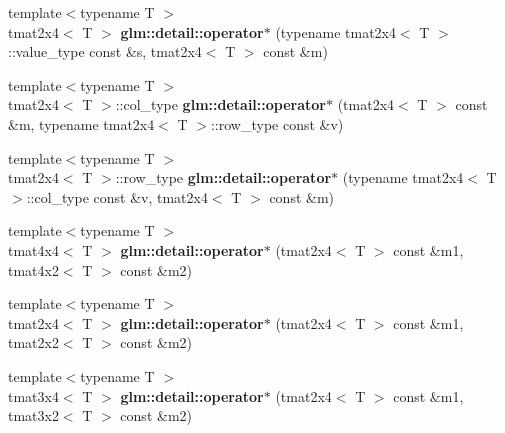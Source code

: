 \begin{DoxyCompactItemize}
\item 
\hypertarget{namespaceglm_1_1detail_a6a8f884957de815fefe3eecf14b9ad35}{{\footnotesize template$<$typename T $>$ }\\tmat2x4$<$ \-T $>$ {\bfseries glm\-::detail\-::operator$\ast$} (typename tmat2x4$<$ \-T $>$\-::value\-\_\-type const \&s, tmat2x4$<$ \-T $>$ const \&m)}\label{namespaceglm_1_1detail_a6a8f884957de815fefe3eecf14b9ad35}

\item 
\hypertarget{namespaceglm_1_1detail_a0710bfafd97af9b8c98a92748fff6468}{{\footnotesize template$<$typename T $>$ }\\tmat2x4$<$ \-T $>$\-::col\-\_\-type {\bfseries glm\-::detail\-::operator$\ast$} (tmat2x4$<$ \-T $>$ const \&m, typename tmat2x4$<$ \-T $>$\-::row\-\_\-type const \&v)}\label{namespaceglm_1_1detail_a0710bfafd97af9b8c98a92748fff6468}

\item 
\hypertarget{namespaceglm_1_1detail_acdec154bb458b5d0654955007cfa9035}{{\footnotesize template$<$typename T $>$ }\\tmat2x4$<$ \-T $>$\-::row\-\_\-type {\bfseries glm\-::detail\-::operator$\ast$} (typename tmat2x4$<$ \-T $>$\-::col\-\_\-type const \&v, tmat2x4$<$ \-T $>$ const \&m)}\label{namespaceglm_1_1detail_acdec154bb458b5d0654955007cfa9035}

\item 
\hypertarget{namespaceglm_1_1detail_aedd97c0dd2e03c63d4188983d811a436}{{\footnotesize template$<$typename T $>$ }\\tmat4x4$<$ \-T $>$ {\bfseries glm\-::detail\-::operator$\ast$} (tmat2x4$<$ \-T $>$ const \&m1, tmat4x2$<$ \-T $>$ const \&m2)}\label{namespaceglm_1_1detail_aedd97c0dd2e03c63d4188983d811a436}

\item 
\hypertarget{namespaceglm_1_1detail_ace5743bbfdfa432d7b8393eac876e614}{{\footnotesize template$<$typename T $>$ }\\tmat2x4$<$ \-T $>$ {\bfseries glm\-::detail\-::operator$\ast$} (tmat2x4$<$ \-T $>$ const \&m1, tmat2x2$<$ \-T $>$ const \&m2)}\label{namespaceglm_1_1detail_ace5743bbfdfa432d7b8393eac876e614}

\item 
\hypertarget{namespaceglm_1_1detail_a24dd8f2447519b24ae1316e2b156c278}{{\footnotesize template$<$typename T $>$ }\\tmat3x4$<$ \-T $>$ {\bfseries glm\-::detail\-::operator$\ast$} (tmat2x4$<$ \-T $>$ const \&m1, tmat3x2$<$ \-T $>$ const \&m2)}\label{namespaceglm_1_1detail_a24dd8f2447519b24ae1316e2b156c278}


\end{DoxyCompactItemize}
